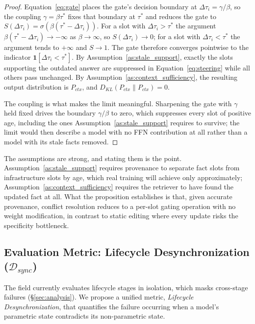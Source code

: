\documentclass[manuscript, screen, review]{jair}
\begin{document}
\begin{proof}
Equation~\ref{eq:gate} places the gate's decision boundary at $\Delta\tau_i = \gamma/\beta$, so the coupling $\gamma = \beta\tau^{\ast}$ fixes that boundary at $\tau^{\ast}$ and reduces the gate to $S(\Delta\tau_i) = \sigma\!\left(\beta(\tau^{\ast} - \Delta\tau_i)\right)$. For a slot with $\Delta\tau_i > \tau^{\ast}$ the argument $\beta(\tau^{\ast} - \Delta\tau_i) \to -\infty$ as $\beta \to \infty$, so $S(\Delta\tau_i) \to 0$; for a slot with $\Delta\tau_i < \tau^{\ast}$ the argument tends to $+\infty$ and $S \to 1$. The gate therefore converges pointwise to the indicator $\mathbf{1}\!\left[\Delta\tau_i < \tau^{\ast}\right]$. By Assumption~\ref{as:stale_support}, exactly the slots supporting the outdated answer are suppressed in Equation~\ref{eq:steering} while all others pass unchanged. By Assumption~\ref{as:context_sufficiency}, the resulting output distribution is $P_{ctx}$, and $D_{KL}(P_{ctx} \| P_{ctx}) = 0$.

The coupling is what makes the limit meaningful. Sharpening the gate with $\gamma$ held fixed drives the boundary $\gamma/\beta$ to zero, which suppresses every slot of positive age, including the ones Assumption~\ref{as:stale_support} requires to survive; the limit would then describe a model with no FFN contribution at all rather than a model with its stale facts removed.
\end{proof}

The assumptions are strong, and stating them is the point. Assumption~\ref{as:stale_support} requires provenance to separate fact slots from infrastructure slots by age, which real training will achieve only approximately; Assumption~\ref{as:context_sufficiency} requires the retriever to have found the updated fact at all. What the proposition establishes is that, given accurate provenance, conflict resolution reduces to a per-slot gating operation with no weight modification, in contrast to static editing where every update risks the specificity bottleneck.

\subsection{Evaluation Metric: Lifecycle Desynchronization (\texorpdfstring{$\mathcal{D}_{sync}$}{D\_sync})}
\label{sec:dsync}

The field currently evaluates lifecycle stages in isolation, which masks cross-stage failures (\S\ref{sec:analysis}). We propose a unified metric, \textit{Lifecycle Desynchronization}, that quantifies the failure occurring when a model's parametric state contradicts its non-parametric state.
\end{document}
